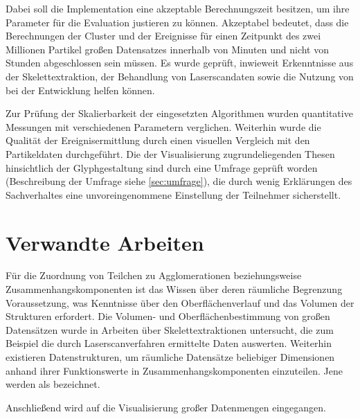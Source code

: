 Dabei soll die Implementation eine akzeptable Berechnungszeit besitzen, um ihre Parameter für die Evaluation justieren zu können. Akzeptabel bedeutet, dass die Berechnungen der Cluster und der Ereignisse für einen Zeitpunkt des zwei Millionen Partikel großen Datensatzes innerhalb von Minuten und nicht von Stunden abgeschlossen sein müssen. Es wurde geprüft, inwieweit Erkenntnisse aus der Skelettextraktion, der Behandlung von Laserscandaten sowie die Nutzung von  bei der Entwicklung helfen können.

Zur Prüfung der Skalierbarkeit der eingesetzten Algorithmen wurden quantitative Messungen mit verschiedenen Parametern verglichen. Weiterhin wurde die Qualität der Ereignisermittlung durch einen visuellen Vergleich mit den Partikeldaten durchgeführt. Die der Visualisierung zugrundeliegenden Thesen hinsichtlich der Glyphgestaltung sind durch eine Umfrage geprüft worden (Beschreibung der Umfrage siehe \autoref{sec:umfrage}), die durch wenig Erklärungen des Sachverhaltes eine unvoreingenommene Einstellung der Teilnehmer sicherstellt.



\chapter{Verwandte Arbeiten}
Für die Zuordnung von Teilchen zu Agglomerationen beziehungsweise Zusammenhangskomponenten ist das Wissen über deren räumliche Begrenzung Voraussetzung, was Kenntnisse über den Oberflächenverlauf und das Volumen der Strukturen erfordert.
Die Volumen- und Oberflächenbestimmung von großen Datensätzen wurde in Arbeiten über Skelettextraktionen untersucht, die zum Beispiel die durch Laserscanverfahren ermittelte Daten auswerten. Weiterhin existieren Datenstrukturen, um räumliche Datensätze beliebiger Dimensionen anhand ihrer Funktionswerte in Zusammenhangskomponenten einzuteilen. Jene werden als  bezeichnet.

Anschließend wird auf die Visualisierung großer Datenmengen eingegangen.

